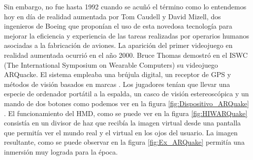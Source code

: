 Sin embargo, no fue hasta 1992 cuando se acuñó el término como lo entendemos hoy en día de realidad aumentada por Tom Caudell y David Mizell, dos ingenieros de Boeing que proponían el uso de esta novedosa tecnología para mejorar la eficiencia y experiencia de las tareas realizadas por operarios humanos asociadas a la fabricación de aviones.
La aparición del primer videojuego en realidad aumentada ocurrió en el año 2000. Bruce Thomas demostró en el ISWC (The International Symposium on Wearable Computers) su videojuego ARQuacke. El sistema empleaba una brújula digital, un receptor de GPS y métodos de visión basados en marcas \cite{ARToolkit}. Los jugadores tenían que llevar una especie de ordenador portátil a la espalda, un casco de visión estereoscópica y un mando de dos botones\cite{ARQuake} como podemos ver en la figura \ref{fig:Dispositivo_ARQuake} . El funcionamiento del HMD, como se puede ver en la figura \ref{fig:HIWARQuake} consistía en un divisor de haz que recibía la imagen virtual desde una pantalla que permitía ver el mundo real y el virtual en los ojos del usuario. La imagen resultante, como se puede observar en la figura \ref{fig:Ex_ARQuake} permitía una inmersión muy lograda para la época.

